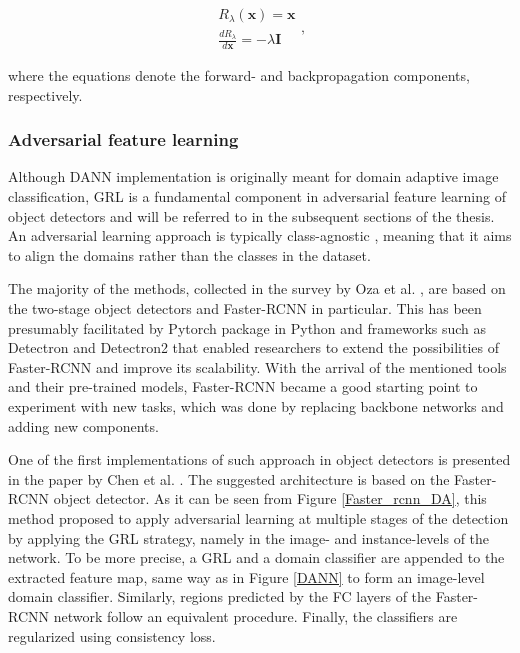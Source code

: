 \begin{equation}
\begin{aligned}
R_{\lambda}(\mathbf{x})=\mathbf{x} \\
\frac{d R_{\lambda}}{d \mathbf{x}}=-\lambda \mathbf{I}
\end{aligned}
\label{eq: GRL},
\end{equation}

where the equations denote the forward- and backpropagation components, respectively. 

\FloatBarrier

\subsubsection{Adversarial feature learning}
\label{adv_approach} 

Although DANN implementation is originally meant for domain adaptive image classification, GRL is a fundamental component in adversarial feature learning of object detectors and will be referred to in the subsequent sections of the thesis. An adversarial learning approach is typically class-agnostic \cite{Rezaeianaran2021}, meaning that it aims to align the domains rather than the classes in the dataset.  

The majority of the methods, collected in the survey by Oza et al. \cite{Oza2021}, are based on the two-stage object detectors and Faster-RCNN \cite{ima} in particular. This has been presumably facilitated by Pytorch \cite{NEURIPS2019_9015} package in Python and frameworks such as Detectron \cite{Detectron2018} and Detectron2 \cite{wu2019Detectron2} that enabled researchers to extend the possibilities of Faster-RCNN and improve its scalability. With the arrival of the mentioned tools and their pre-trained models, Faster-RCNN became a good starting point to experiment with new tasks, which was done by replacing backbone networks and adding new components. 

One of the first implementations of such approach in object detectors is presented in the paper by Chen et al. \cite{Chen2018}. The suggested architecture is based on the Faster-RCNN object detector. As it can be seen from Figure \ref{Faster_rcnn_DA}, this method proposed to apply adversarial learning at multiple stages of the detection by applying the GRL strategy, namely in the image- and instance-levels of the network. To be more precise, a GRL and a domain classifier are appended to the extracted feature map, same way as in Figure \ref{DANN} to form an image-level domain classifier. Similarly, regions predicted by the FC layers of the Faster-RCNN network follow an equivalent procedure. Finally, the classifiers are regularized using consistency loss.   

